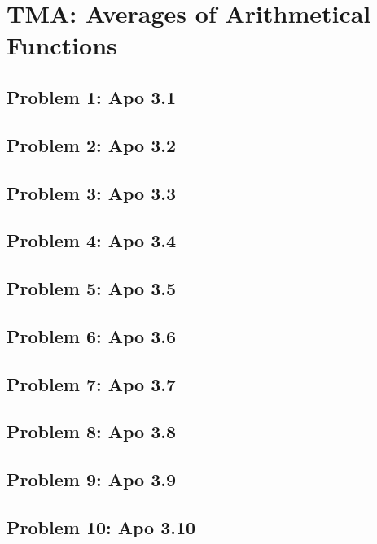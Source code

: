 \section{TMA: Averages of Arithmetical Functions}

\subsection[Problem 1]{Problem 1: Apo 3.1}

\subsection[Problem 2]{Problem 2: Apo 3.2}

\subsection[Problem 3]{Problem 3: Apo 3.3}

\subsection[Problem 4]{Problem 4: Apo 3.4}

\subsection[Problem 5]{Problem 5: Apo 3.5}

\subsection[Problem 6]{Problem 6: Apo 3.6}

\subsection[Problem 7]{Problem 7: Apo 3.7}

\subsection[Problem 8]{Problem 8: Apo 3.8}

\subsection[Problem 9]{Problem 9: Apo 3.9}

\subsection[Problem 10]{Problem 10: Apo 3.10}